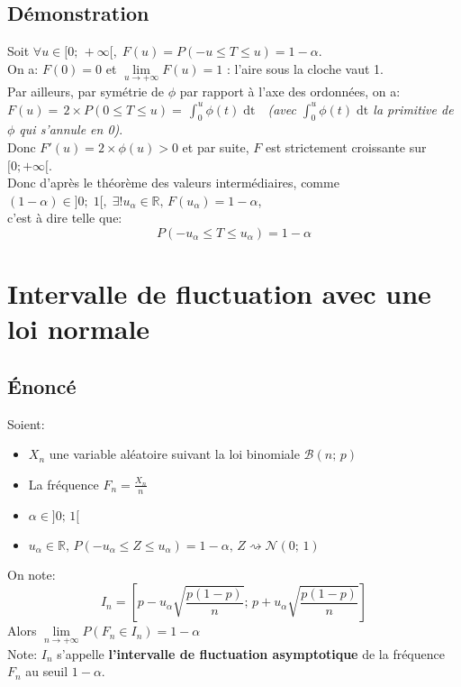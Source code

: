 \documentclass[12px]{article}
\begin{document}
	\subsection{Démonstration}
	Soit $\forall u\in [0; \, +\infty[,\; F(u) = P(-u\leq T\leq u) = 1-\alpha$.\\
	On a: $F(0)=0$ et $\lim\limits_{u\rightarrow +\infty}F(u)=1$ : l'aire sous la cloche vaut 1.\\
	Par ailleurs, par symétrie de $\phi$ par rapport à l'axe des ordonnées, on a:\\
	$F(u) =\, 2\times P(0\leq T\leq u) =\, \int_{0}^{u}\phi (t)\; \mathrm{dt}$\ \  \emph{(avec $\int_{0}^{u}\phi (t)\; \mathrm{dt}$ la primitive de $\phi$ qui s'annule en 0)}.\\
	Donc $F'(u) = 2\times \phi (u) >0$ et par suite, $F$ est strictement croissante sur $[0; +\infty[$.\\
	Donc d'après le théorème des valeurs intermédiaires, comme $(1-\alpha)\in ]0;\; 1[,\; \exists ! u_\alpha\in\mathbb{R},\, F(u_\alpha) = 1-\alpha$,\\
	c'est à dire telle que:
	\begin{displaymath}
		P(-u_\alpha\leq T \leq u_\alpha) = 1-\alpha
	\end{displaymath}
	
	\newpage
	\section{Intervalle de fluctuation avec une loi normale}
	
	\subsection{\'Enoncé}
	Soient:
	\begin{itemize}
		\item $X_n$ une variable aléatoire suivant la loi binomiale $\mathcal{B}(n;\, p)$
		\item La fréquence $F_n=\frac{X_n}{n}$
		\item $\alpha\in ]0;\, 1[$
		\item $u_\alpha\in\mathbb{R},\, P(-u_\alpha\leq Z\leq u_\alpha)=1-\alpha,\, Z\rightsquigarrow \mathcal{N}(0;\, 1)$
	\end{itemize}
	On note:
	\begin{displaymath}
		I_n = \left[  p-u_\alpha\sqrt{\frac{p(1-p)}{n}} ;\, p+u_\alpha\sqrt{\frac{p(1-p)}{n}} \right]
	\end{displaymath}
	Alors $\lim\limits_{n\rightarrow +\infty}P(F_n\in I_n)=1-\alpha$\\
	Note: $I_n$ s'appelle \textbf{l'intervalle de fluctuation asymptotique} de la fréquence $F_n$ au seuil $1-\alpha $.
	
\end{document}
